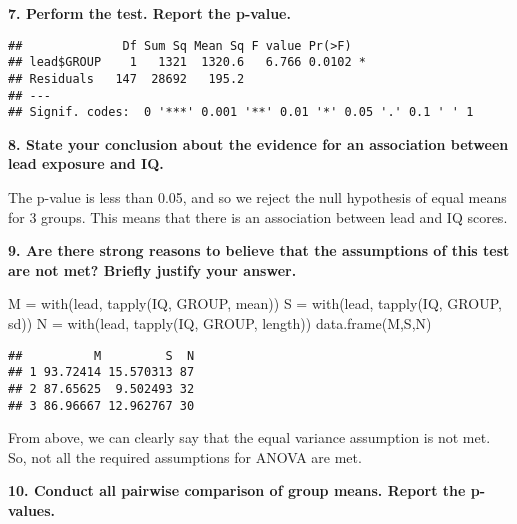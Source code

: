 \documentclass[
]{article}
\newenvironment{Shaded}{\begin{snugshade}}{\end{snugshade}}
\newcommand{\AttributeTok}[1]{\textcolor[rgb]{0.77,0.63,0.00}{#1}}
\newcommand{\FunctionTok}[1]{\textcolor[rgb]{0.00,0.00,0.00}{#1}}
\newcommand{\NormalTok}[1]{#1}
\newcommand{\OtherTok}[1]{\textcolor[rgb]{0.56,0.35,0.01}{#1}}
\newcommand{\SpecialCharTok}[1]{\textcolor[rgb]{0.00,0.00,0.00}{#1}}
\begin{document}
\textbf{7. Perform the test. Report the p-value.}

\begin{Shaded}
\end{Shaded}

\begin{verbatim}
##              Df Sum Sq Mean Sq F value Pr(>F)  
## lead$GROUP    1   1321  1320.6   6.766 0.0102 *
## Residuals   147  28692   195.2                 
## ---
## Signif. codes:  0 '***' 0.001 '**' 0.01 '*' 0.05 '.' 0.1 ' ' 1
\end{verbatim}

\textbf{8. State your conclusion about the evidence for an association
between lead exposure and IQ.}

The p-value is less than 0.05, and so we reject the null hypothesis of
equal means for 3 groups. This means that there is an association
between lead and IQ scores.

\textbf{9. Are there strong reasons to believe that the assumptions of
this test are not met? Briefly justify your answer.}

\begin{Shaded}
\begin{Highlighting}[]
\NormalTok{M }\OtherTok{=} \FunctionTok{with}\NormalTok{(lead, }\FunctionTok{tapply}\NormalTok{(IQ, GROUP, mean))}
\NormalTok{S }\OtherTok{=} \FunctionTok{with}\NormalTok{(lead, }\FunctionTok{tapply}\NormalTok{(IQ, GROUP, sd))}
\NormalTok{N }\OtherTok{=} \FunctionTok{with}\NormalTok{(lead, }\FunctionTok{tapply}\NormalTok{(IQ, GROUP, length))}
\FunctionTok{data.frame}\NormalTok{(M,S,N)}
\end{Highlighting}
\end{Shaded}

\begin{verbatim}
##          M         S  N
## 1 93.72414 15.570313 87
## 2 87.65625  9.502493 32
## 3 86.96667 12.962767 30
\end{verbatim}

From above, we can clearly say that the equal variance assumption is not
met. So, not all the required assumptions for ANOVA are met.

\textbf{10. Conduct all pairwise comparison of group means. Report the
p-values.}
\end{document}
